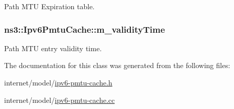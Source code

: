 Path M\+TU Expiration table. 

\subsubsection[{\texorpdfstring{m\+\_\+validity\+Time}{m_validityTime}}]{ ns3\+::\+Ipv6\+Pmtu\+Cache\+::m\+\_\+validity\+Time\hspace{0.3cm}{\ttfamily [private]}}\hypertarget{classns3_1_1Ipv6PmtuCache_aad204229ec877a85eaebb1e9dd0f01d2}{}\label{classns3_1_1Ipv6PmtuCache_aad204229ec877a85eaebb1e9dd0f01d2}


Path M\+TU entry validity time. 



The documentation for this class was generated from the following files\+:\begin{DoxyCompactItemize}
\item 
internet/model/\hyperlink{ipv6-pmtu-cache_8h}{ipv6-\/pmtu-\/cache.\+h}\item 
internet/model/\hyperlink{ipv6-pmtu-cache_8cc}{ipv6-\/pmtu-\/cache.\+cc}\end{DoxyCompactItemize}
